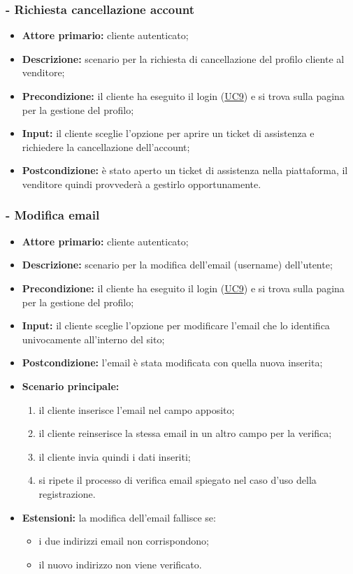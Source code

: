 \subsubsection{ - Richiesta cancellazione account}
\begin{itemize}
    \item \textbf{Attore primario:} cliente autenticato;
    \item \textbf{Descrizione:} scenario per la richiesta di cancellazione del profilo cliente al venditore;
    \item \textbf{Precondizione:} il cliente ha eseguito il login (\hyperref[UC9]{UC9}) e si trova sulla pagina per la gestione del profilo;
    \item \textbf{Input:} il cliente sceglie l'opzione per aprire un ticket di assistenza e richiedere la cancellazione dell'account;
    \item \textbf{Postcondizione:} è stato aperto un ticket di assistenza nella piattaforma, il venditore quindi provvederà a gestirlo opportunamente.
\end{itemize}

\stepsubUserCase
\subsubsection{ - Modifica email}
\begin{itemize}
    \item \textbf{Attore primario:} cliente autenticato;
    \item \textbf{Descrizione:} scenario per la modifica dell'email (username) dell'utente;
    \item \textbf{Precondizione:} il cliente ha eseguito il login (\hyperref[UC9]{UC9}) e si trova sulla pagina per la gestione del profilo;
    \item \textbf{Input:} il cliente sceglie l'opzione per modificare l'email che lo identifica univocamente all'interno del sito;
    \item \textbf{Postcondizione:} l'email è stata modificata con quella nuova inserita;
    \item \textbf{Scenario principale:}
    \begin{enumerate}
        \item il cliente inserisce l'email nel campo apposito;
        \item il cliente reinserisce la stessa email in un altro campo per la verifica;
        \item il cliente invia quindi i dati inseriti;
        \item si ripete il processo di verifica email spiegato nel caso d'uso della registrazione.
    \end{enumerate}
    \item \textbf{Estensioni:} la modifica dell'email fallisce se:
    \begin{itemize}
        \item i due indirizzi email non corrispondono;
        \item il nuovo indirizzo non viene verificato.
    \end{itemize}
\end{itemize}

